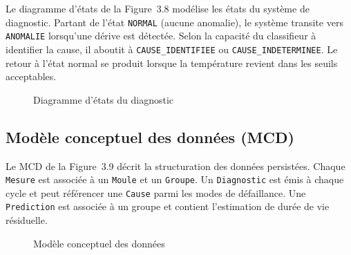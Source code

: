 Le diagramme d'états de la Figure~3.8 modélise les états du système de diagnostic. Partant de l'état \texttt{NORMAL} (aucune anomalie), le système transite vers \texttt{ANOMALIE} lorsqu'une dérive est détectée. Selon la capacité du classifieur à identifier la cause, il aboutit à \texttt{CAUSE\_IDENTIFIEE} ou \texttt{CAUSE\_INDETERMINEE}. Le retour à l'état normal se produit lorsque la température revient dans les seuils acceptables.

\begin{figure}[H]
  \centering
  \caption{Diagramme d'états du diagnostic}
\end{figure}


\subsection{Modèle conceptuel des données (MCD)}

Le MCD de la Figure~3.9 décrit la structuration des données persistées. Chaque \texttt{Mesure} est associée à un \texttt{Moule} et un \texttt{Groupe}. Un \texttt{Diagnostic} est émis à chaque cycle et peut référencer une \texttt{Cause} parmi les modes de défaillance. Une \texttt{Prediction} est associée à un groupe et contient l'estimation de durée de vie résiduelle.

\begin{figure}[htbp]
  \centering
  \caption{Modèle conceptuel des données}
\end{figure}


